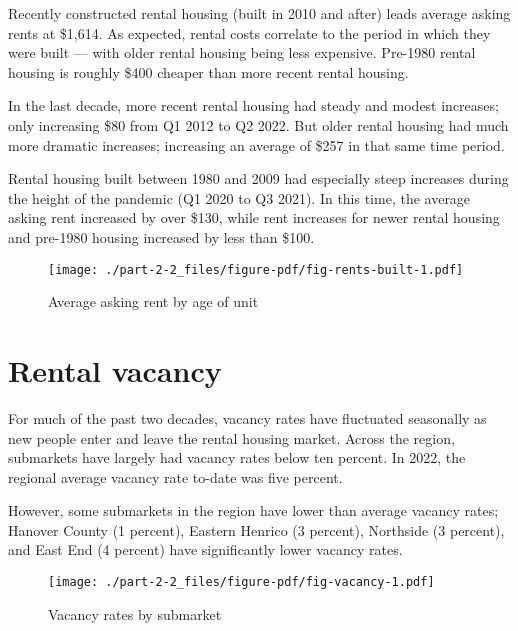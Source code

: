 \documentclass[
  letterpaper,
  DIV=11,
  numbers=noendperiod]{scrreprt}
\begin{document}
Recently constructed rental housing (built in 2010 and after) leads
average asking rents at \$1,614. As expected, rental costs correlate to
the period in which they were built --- with older rental housing being
less expensive. Pre-1980 rental housing is roughly \$400 cheaper than
more recent rental housing.

In the last decade, more recent rental housing had steady and modest
increases; only increasing \$80 from Q1 2012 to Q2 2022. But older
rental housing had much more dramatic increases; increasing an average
of \$257 in that same time period.

Rental housing built between 1980 and 2009 had especially steep
increases during the height of the pandemic (Q1 2020 to Q3 2021). In
this time, the average asking rent increased by over \$130, while rent
increases for newer rental housing and pre-1980 housing increased by
less than \$100.

\begin{figure}

{\centering \texttt{[image: ./part-2-2\_files/figure-pdf/fig-rents-built-1.pdf]}

}

\caption{\label{fig-rents-built}Average asking rent by age of unit}

\end{figure}

\hypertarget{rental-vacancy}{%
\section{Rental vacancy}\label{rental-vacancy}}

For much of the past two decades, vacancy rates have fluctuated
seasonally as new people enter and leave the rental housing market.
Across the region, submarkets have largely had vacancy rates below ten
percent. In 2022, the regional average vacancy rate to-date was five
percent.

However, some submarkets in the region have lower than average vacancy
rates; Hanover County (1 percent), Eastern Henrico (3 percent),
Northside (3 percent), and East End (4 percent) have significantly lower
vacancy rates.

\begin{figure}

{\centering \texttt{[image: ./part-2-2\_files/figure-pdf/fig-vacancy-1.pdf]}

}

\caption{\label{fig-vacancy}Vacancy rates by submarket}

\end{figure}
\end{document}
